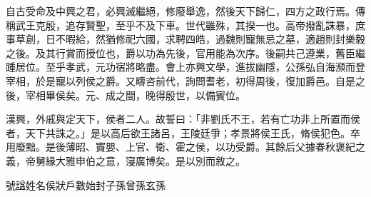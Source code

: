 
\begin{pinyinscope}
自古受命及中興之君，必興滅繼絕，修廢舉逸，然後天下歸仁，四方之政行焉。傳稱武王克殷，追存賢聖，至乎不及下車。世代雖殊，其揆一也。高帝撥亂誅暴，庶事草創，日不暇給，然猶修祀六國，求聘四皓，過魏則寵無忌之墓，適趙則封樂毅之後。及其行賞而授位也，爵以功為先後，官用能為次序。後嗣共己遵業，舊臣繼踵居位。至乎孝武，元功宿將略盡。會上亦興文學，進拔幽隱，公孫弘自海瀕而登宰相，於是寵以列侯之爵。又疇咨前代，詢問耆老，初得周後，復加爵邑。自是之後，宰相畢侯矣。元、成之間，晚得殷世，以備賓位。

漢興，外戚與定天下，侯者二人。故誓曰：「非劉氏不王，若有亡功非上所置而侯者，天下共誅之。」是以高后欲王諸呂，王陵廷爭；孝景將侯王氏，脩侯犯色。卒用廢黜。是後薄昭、竇嬰、上官、衛、霍之侯，以功受爵。其餘后父據春秋褒紀之義，帝舅緣大雅申伯之意，寖廣博矣。是以別而敘之。

號諡姓名侯狀戶數始封子孫曾孫玄孫


\end{pinyinscope}